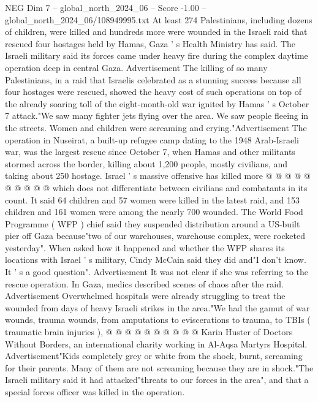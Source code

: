 \begin{textsample}{NEG Dim 7 – global\_north\_2024\_06 – Score -1.00 – global\_north\_2024\_06/108949995.txt}  \label{ex:f7_neg_374}
At least 274 Palestinians, including dozens of children, were killed and hundreds more were wounded in the Israeli raid that rescued four hostages held by Hamas, Gaza ' s Health Ministry has said.
The Israeli military said its forces came under heavy fire during the complex daytime operation deep in central Gaza.
Advertisement The killing of so many Palestinians, in a raid that Israelis celebrated as a stunning success because all four hostages were rescued, showed the heavy cost of such operations on top of the already soaring toll of the eight-month-old war ignited by Hamas ' s October 7 attack."We saw many fighter jets flying over the area.
We saw people fleeing in the streets.
Women and children were screaming and crying."Advertisement The operation in Nuseirat, a built-up refugee camp dating to the 1948 Arab-Israeli war, was the largest rescue since October 7, when Hamas and other militants stormed across the border, killing about 1,200 people, mostly civilians, and taking about 250 hostage.
Israel ' s massive offensive has killed more @ @ @ @ @ @ @ @ @ @ which does not differentiate between civilians and combatants in its count.
It said 64 children and 57 women were killed in the latest raid, and 153 children and 161 women were among the nearly 700 wounded.
The World Food Programme ( WFP ) chief said they suspended distribution around a US-built pier off Gaza because"two of our warehouses, warehouse complex, were rocketed yesterday".
When asked how it happened and whether the WFP shares its locations with Israel ' s military, Cindy McCain said they did and"I don't know.
It ' s a good question".
Advertisement It was not clear if she was referring to the rescue operation.
In Gaza, medics described scenes of chaos after the raid.
Advertisement Overwhelmed hospitals were already struggling to treat the wounded from days of heavy Israeli strikes in the area."We had the gamut of war wounds, trauma wounds, from amputations to eviscerations to trauma, to TBIs ( traumatic brain injuries ), @ @ @ @ @ @ @ @ @ @ Karin Huster of Doctors Without Borders, an international charity working in Al-Aqsa Martyrs Hospital.
Advertisement"Kids completely grey or white from the shock, burnt, screaming for their parents.
Many of them are not screaming because they are in shock."The Israeli military said it had attacked"threats to our forces in the area", and that a special forces officer was killed in the operation.

\end{textsample}
